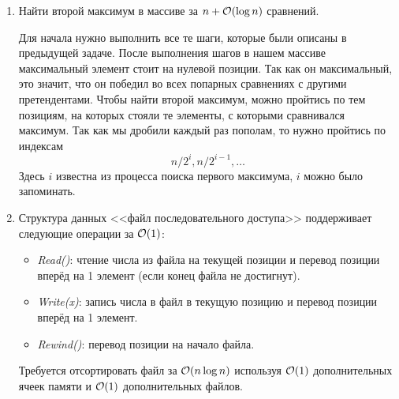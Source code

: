 \begin{enumerate}
  \item
	Найти второй максимум в массиве за $n + \mathcal{O}(\log n)$ сравнений.
	\begin{solution}
		Для начала нужно выполнить все те шаги, которые были описаны в предыдущей задаче. После выполнения шагов в нашем массиве максимальный элемент стоит на нулевой позиции. Так как он максимальный, это значит, что он победил во всех попарных сравнениях с другими претендентами. Чтобы найти второй максимум, можно пройтись по тем позициям, на которых стояли те элементы, с которыми сравнивался максимум. Так как мы дробили каждый раз пополам, то нужно пройтись по индексам
		\begin{equation}
			n/{2^i}, n/{2^{i-1}}, \ldots
		\end{equation}
		Здесь $i$ известна из процесса поиска первого максимума, $i$ можно было запоминать.
	\end{solution}

  \item
	Структура данных <<файл последовательного доступа>>
	поддерживает следующие операции за $\mathcal{O}(1)$:
	\begin{itemize}
		\item \emph{Read()}: чтение числа из файла на текущей
		позиции и перевод позиции вперёд на 1 элемент (если конец файла не достигнут).
		\item \emph{Write(x)}: запись числа в файл в текущую
		позицию и перевод позиции вперёд на 1 элемент.
		\item \emph{Rewind()}: перевод позиции на начало файла.
	\end{itemize}

	Требуется отсортировать файл за $\mathcal{O}(n \log{n})$ используя
	$\mathcal{O}(1)$ дополнительных ячеек памяти и $\mathcal{O}(1)$ дополнительных файлов.




\end{enumerate}
